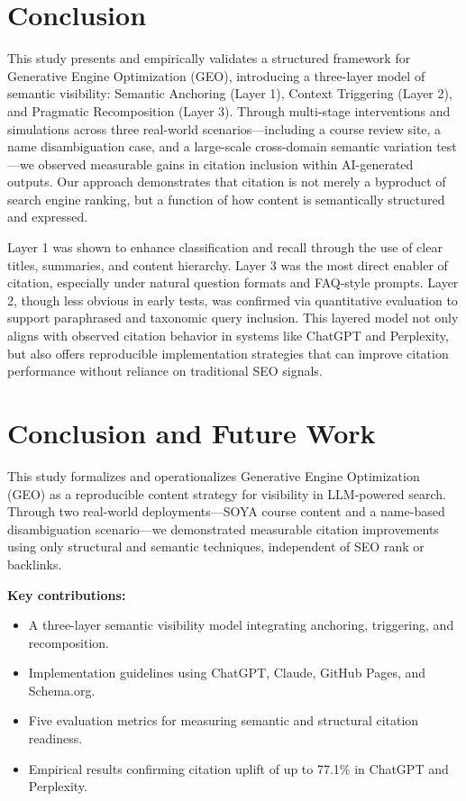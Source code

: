 \section{Conclusion}

This study presents and empirically validates a structured framework for Generative Engine Optimization (GEO), introducing a three-layer model of semantic visibility: Semantic Anchoring (Layer 1), Context Triggering (Layer 2), and Pragmatic Recomposition (Layer 3). Through multi-stage interventions and simulations across three real-world scenarios—including a course review site, a name disambiguation case, and a large-scale cross-domain semantic variation test—we observed measurable gains in citation inclusion within AI-generated outputs. Our approach demonstrates that citation is not merely a byproduct of search engine ranking, but a function of how content is semantically structured and expressed.

Layer 1 was shown to enhance classification and recall through the use of clear titles, summaries, and content hierarchy. Layer 3 was the most direct enabler of citation, especially under natural question formats and FAQ-style prompts. Layer 2, though less obvious in early tests, was confirmed via quantitative evaluation to support paraphrased and taxonomic query inclusion. This layered model not only aligns with observed citation behavior in systems like ChatGPT and Perplexity, but also offers reproducible implementation strategies that can improve citation performance without reliance on traditional SEO signals.

\section{Conclusion and Future Work}

This study formalizes and operationalizes Generative Engine Optimization (GEO) as a reproducible content strategy for visibility in LLM-powered search. Through two real-world deployments---SOYA course content and a name-based disambiguation scenario---we demonstrated measurable citation improvements using only structural and semantic techniques, independent of SEO rank or backlinks.

\textbf{Key contributions:}
\begin{itemize}
  \item A three-layer semantic visibility model integrating anchoring, triggering, and recomposition.
  \item Implementation guidelines using ChatGPT, Claude, GitHub Pages, and Schema.org.
  \item Five evaluation metrics for measuring semantic and structural citation readiness.
  \item Empirical results confirming citation uplift of up to 77.1\% in ChatGPT and Perplexity.
\end{itemize}

